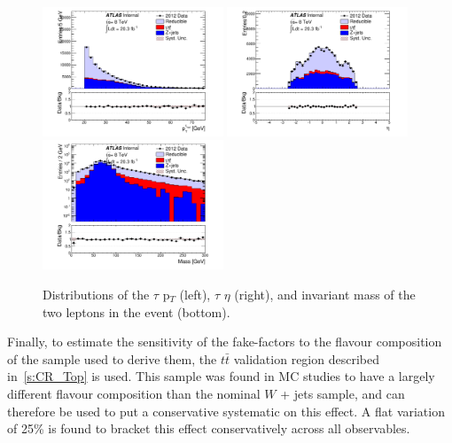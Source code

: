 \begin{figure}
\centering \includegraphics[width=0.48\textwidth]{figures/ch7-modelindependent/TauFakes_ClosurePt}
\centering \includegraphics[width=0.48\textwidth]{figures/ch7-modelindependent/TauFakes_ClosureEta}
\centering \includegraphics[width=0.48\textwidth]{figures/ch7-modelindependent/TauFakes_ClosureMass}
\caption{\label{fig:tauclosure} Distributions of the $\tau$ p$_{T}$ (left), $\tau$ $\eta$
  (right), and invariant mass of the two leptons in the event (bottom).}
\end{figure}


Finally, to estimate the sensitivity of the fake-factors to the flavour composition of the
sample used to derive them, the $t\bar{t}$ validation region described in~\ref{s:CR_Top}
is used. This sample was found in MC studies to have a largely different flavour
composition than the nominal $W$ + jets sample, and can therefore be used to put a
conservative systematic on this effect.  A flat variation of 25\% is found to bracket this
effect conservatively across all observables.


